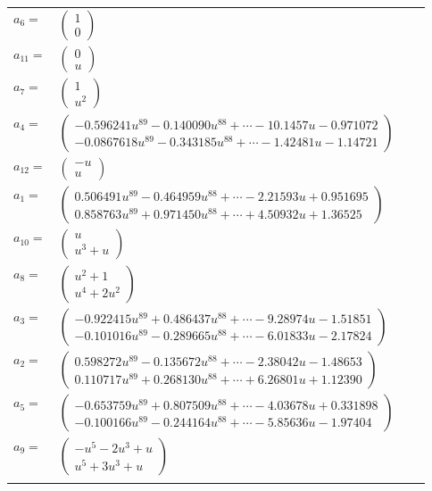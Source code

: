 \documentclass[1p]{elsarticle_modified}
\theoremstyle{definition}
\begin{document}
\begin{tabular}{m{7pt} m{180pt} m{7pt} m{180pt} }
\flushright $a_{6}=$&$\begin{pmatrix}1\\0\end{pmatrix}$ \\
\flushright $a_{11}=$&$\begin{pmatrix}0\\u\end{pmatrix}$ \\
\flushright $a_{7}=$&$\begin{pmatrix}1\\u^2\end{pmatrix}$ \\
\flushright $a_{4}=$&$\begin{pmatrix}-0.596241 u^{89}-0.140090 u^{88}+\cdots-10.1457 u-0.971072\\-0.0867618 u^{89}-0.343185 u^{88}+\cdots-1.42481 u-1.14721\end{pmatrix}$ \\
\flushright $a_{12}=$&$\begin{pmatrix}- u\\u\end{pmatrix}$ \\
\flushright $a_{1}=$&$\begin{pmatrix}0.506491 u^{89}-0.464959 u^{88}+\cdots-2.21593 u+0.951695\\0.858763 u^{89}+0.971450 u^{88}+\cdots+4.50932 u+1.36525\end{pmatrix}$ \\
\flushright $a_{10}=$&$\begin{pmatrix}u\\u^3+u\end{pmatrix}$ \\
\flushright $a_{8}=$&$\begin{pmatrix}u^2+1\\u^4+2 u^2\end{pmatrix}$ \\
\flushright $a_{3}=$&$\begin{pmatrix}-0.922415 u^{89}+0.486437 u^{88}+\cdots-9.28974 u-1.51851\\-0.101016 u^{89}-0.289665 u^{88}+\cdots-6.01833 u-2.17824\end{pmatrix}$ \\
\flushright $a_{2}=$&$\begin{pmatrix}0.598272 u^{89}-0.135672 u^{88}+\cdots-2.38042 u-1.48653\\0.110717 u^{89}+0.268130 u^{88}+\cdots+6.26801 u+1.12390\end{pmatrix}$ \\
\flushright $a_{5}=$&$\begin{pmatrix}-0.653759 u^{89}+0.807509 u^{88}+\cdots-4.03678 u+0.331898\\-0.100166 u^{89}-0.244164 u^{88}+\cdots-5.85636 u-1.97404\end{pmatrix}$ \\
\flushright $a_{9}=$&$\begin{pmatrix}- u^5-2 u^3+u\\u^5+3 u^3+u\end{pmatrix}$\\&\end{tabular}
\end{document}
